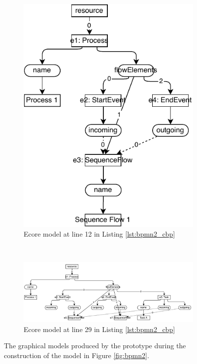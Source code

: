 \documentclass[conference]{IEEEtran}
\begin{document}
\begin{figure}
\begin{subfigure}[t]{0.40\linewidth}
    \includegraphics[width=\linewidth]{ecore_12}
    \caption{Ecore model at line 12 in Listing \ref{lst:bpmn2_cbp}}
    \label{fig:ecore_12}
  \end{subfigure}
  \\
  \begin{subfigure}[t]{\linewidth}
    \centering
    \includegraphics[width=\linewidth]{ecore_32}
    \caption{Ecore model at line 29 in Listing \ref{lst:bpmn2_cbp}}
    \label{fig:ecore_29}
  \end{subfigure}
  \caption{The graphical models produced by the prototype during the construction of the model in Figure \ref{fig:bpmn2}.}
  \label{fig:prototype}
\end{figure}
\end{document}
